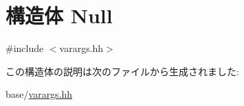 \hypertarget{structVarArgs_1_1Null}{
\section{構造体 Null}
\label{structVarArgs_1_1Null}
}


{\ttfamily \#include $<$varargs.hh$>$}

この構造体の説明は次のファイルから生成されました:\begin{DoxyCompactItemize}
\item 
base/\hyperlink{varargs_8hh}{varargs.hh}\end{DoxyCompactItemize}
